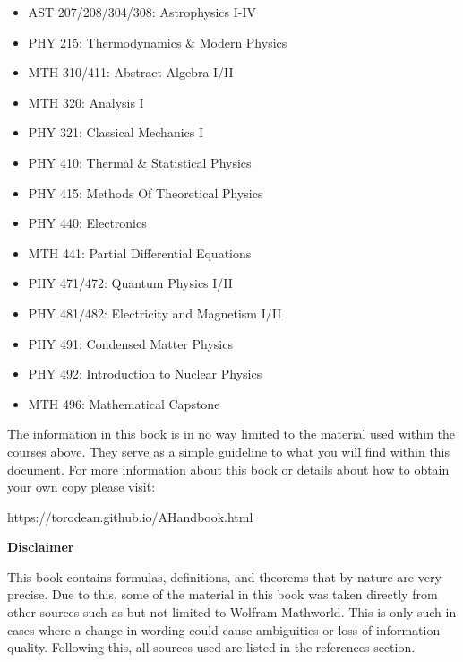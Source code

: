 \begin{multicols}{2}
\begin{itemize}
	\item AST 207/208/304/308: Astrophysics I-IV
	\item PHY 215: Thermodynamics \& Modern Physics
	\item MTH 310/411: Abstract Algebra I/II
	\item MTH 320: Analysis I
	\item PHY 321: Classical Mechanics I
	\item PHY 410: Thermal \& Statistical Physics
	\item PHY 415: Methods Of Theoretical Physics
	\item PHY 440: Electronics
	\item MTH 441: Partial Differential Equations
	\item PHY 471/472: Quantum Physics I/II
	\item PHY 481/482: Electricity and Magnetism I/II
	\item PHY 491: Condensed Matter Physics
	\item PHY 492: Introduction to Nuclear Physics
	\item MTH 496: Mathematical Capstone
\end{itemize} 
\end{multicols}

The information in this book is in no way limited to the material used within the courses above. They serve as a simple guideline to what you will find within this document. For more information about this book or details about how to obtain your own copy please visit:
\begin{center}
	https://torodean.github.io/AHandbook.html
\end{center}
\begin{center}
	\textbf{Disclaimer}
\end{center}

This book contains formulas, definitions, and theorems that by nature are very precise. Due to this, some of the material in this book was taken directly from other sources such as but not limited to Wolfram Mathworld. This is only such in cases where a change in wording could cause ambiguities or loss of information quality.  Following this, all sources used are listed in the references section.